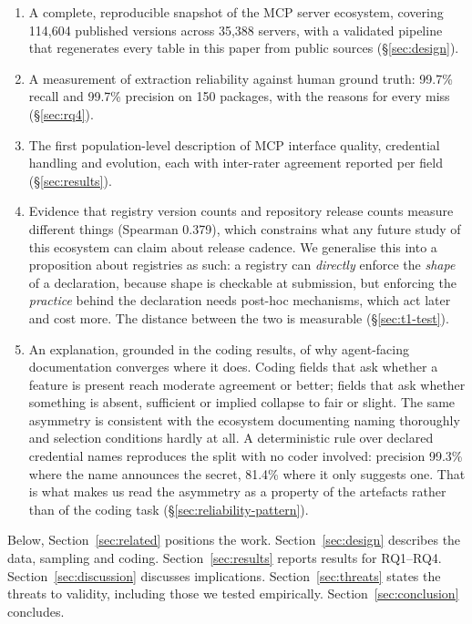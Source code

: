 \documentclass[a4paper,fleqn]{cas-dc}
\begin{document}
\begin{enumerate}
\item A complete, reproducible snapshot of the MCP server ecosystem, covering
114,604 published versions across 35,388 servers, with a validated pipeline
that regenerates every table in this paper from public sources
(\S\ref{sec:design}).
\item A measurement of extraction reliability against human ground truth:
99.7\% recall and 99.7\% precision on 150 packages, with the reasons for every
miss (\S\ref{sec:rq4}).
\item The first population-level description of MCP interface quality,
credential handling and evolution, each with inter-rater agreement reported
per field (\S\ref{sec:results}).
\item Evidence that registry version counts and repository release counts
measure different things (Spearman 0.379), which constrains what any future
study of this ecosystem can claim about release cadence. We generalise this into
a proposition about registries as such: a registry can \emph{directly} enforce
the \emph{shape} of a declaration, because shape is checkable at submission, but
enforcing the \emph{practice} behind the declaration needs post-hoc mechanisms,
which act later and cost more. The distance between the two is measurable
(\S\ref{sec:t1-test}).
\item An explanation, grounded in the coding results, of why agent-facing
documentation converges where it does. Coding fields that ask whether a feature
is present reach moderate agreement or better; fields that ask whether something
is absent, sufficient or implied collapse to fair or slight. The same asymmetry
is consistent with the ecosystem documenting naming thoroughly and selection
conditions hardly at all. A deterministic rule over declared credential names
reproduces the split with no coder involved: precision 99.3\% where the name
announces the secret, 81.4\% where it only suggests one. That is what makes us
read the asymmetry as a property of the artefacts rather than of the coding
task (\S\ref{sec:reliability-pattern}).
\end{enumerate}

Below, Section~\ref{sec:related} positions the work.
Section~\ref{sec:design} describes the data, sampling and coding.
Section~\ref{sec:results} reports results for RQ1--RQ4.
Section~\ref{sec:discussion} discusses implications.
Section~\ref{sec:threats} states the threats to validity, including those we
tested empirically. Section~\ref{sec:conclusion} concludes.
\end{document}
